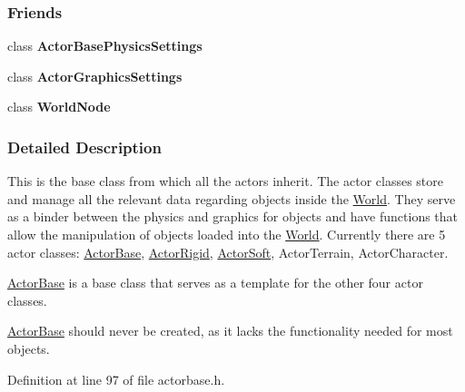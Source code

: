 \subsubsection*{Friends}
\begin{DoxyCompactItemize}
\item 
\hypertarget{classMezzanine_1_1ActorBase_ad56afa2bffce8b552583041f21297874}{
class {\bfseries ActorBasePhysicsSettings}}
\label{classMezzanine_1_1ActorBase_ad56afa2bffce8b552583041f21297874}

\item 
\hypertarget{classMezzanine_1_1ActorBase_a01f5bcaf4807085e756d9c03b3eb8d9d}{
class {\bfseries ActorGraphicsSettings}}
\label{classMezzanine_1_1ActorBase_a01f5bcaf4807085e756d9c03b3eb8d9d}

\item 
\hypertarget{classMezzanine_1_1ActorBase_a1cacd07efb11226da49a7c80569b18e8}{
class {\bfseries WorldNode}}
\label{classMezzanine_1_1ActorBase_a1cacd07efb11226da49a7c80569b18e8}

\end{DoxyCompactItemize}


\subsubsection{Detailed Description}
This is the base class from which all the actors inherit. The actor classes store and manage all the relevant data regarding objects inside the \hyperlink{classMezzanine_1_1World}{World}. They serve as a binder between the physics and graphics for objects and have functions that allow the manipulation of objects loaded into the \hyperlink{classMezzanine_1_1World}{World}. Currently there are 5 actor classes: \hyperlink{classMezzanine_1_1ActorBase}{ActorBase}, \hyperlink{classMezzanine_1_1ActorRigid}{ActorRigid}, \hyperlink{classMezzanine_1_1ActorSoft}{ActorSoft}, ActorTerrain, ActorCharacter. \par
 \hyperlink{classMezzanine_1_1ActorBase}{ActorBase} is a base class that serves as a template for the other four actor classes. \par
 \hyperlink{classMezzanine_1_1ActorBase}{ActorBase} should never be created, as it lacks the functionality needed for most objects. 

Definition at line 97 of file actorbase.h.



